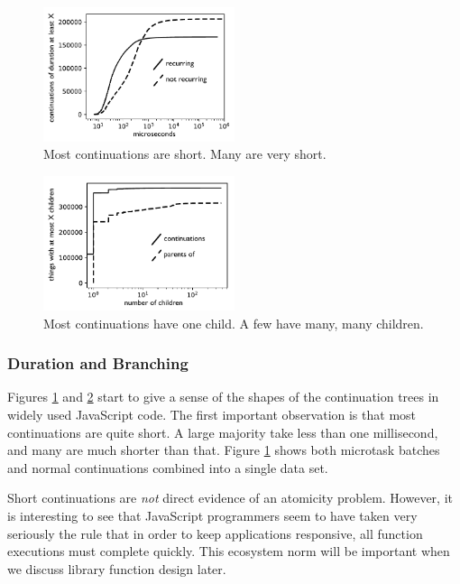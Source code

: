 \documentclass[sigplan,10pt,review,anonymous]{acmart}\settopmatter{printfolios=true,printccs=false,printacmref=false}
\begin{document}
\begin{figure}
\hspace*{-0.2cm}\includegraphics[width=0.5\textwidth]{duration_graph_bw}
\caption{Most continuations are short.
  Many are very short.}
\label{fig:graph_duration}
\end{figure}

\begin{figure}
\hspace*{-0.2cm}\includegraphics[width=0.5\textwidth]{children_graph_bw}
\caption{Most continuations have one child.
A few have many, many children.}
\label{fig:graph_branching}
\end{figure}

\subsubsection{Duration and Branching}

Figures \ref{fig:graph_duration} and \ref{fig:graph_branching} start to give a sense of the shapes of the continuation trees in widely used JavaScript code.
The first important observation is that most continuations are quite short.
A large majority take less than one millisecond, and many are much shorter than that.
Figure \ref{fig:graph_duration} shows both microtask batches and normal continuations combined into a single data set.

Short continuations are \emph{not} direct evidence of an atomicity problem.
However, it is interesting to see that JavaScript programmers seem to have taken very seriously the rule that in order to keep applications responsive, all function executions must complete quickly.
This ecosystem norm will be important when we discuss library function design later.
\end{document}
